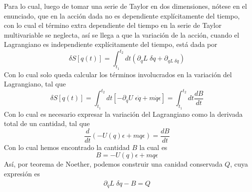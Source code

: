 \documentclass[../main_ej.tex]{subfiles}
\begin{document}
Para lo cual, luego de tomar una serie de Taylor en dos dimensiones, nótese en el enunciado, que en la acción dada no es dependiente explícitamente del tiempo, con lo cual el término extra dependiente del tiempo en la serie de Taylor multivariable se neglecta, así se llega a que la variación de la acción, cuando el Lagrangiano es independiente explícitamente del tiempo, está dada por
\begin{equation}
  \delta S[q(t)] = \int_{t_1}^{t_2} dt \left( \partial_q L \; \delta q + \partial_{\dot{q}L \;\delta \dot{q}}  \right)
\end{equation}
Con lo cual solo queda calcular los términos involucrados en la variación del Lagrangiano, tal que
\begin{equation}
  \delta S[q(t)] = \int_{t_1}^{t_2} dt \left[ -\partial_qU\; \epsilon\dot{q} + m\dot{q}\epsilon \right] = \int_{t_1}^{t_2} dt \frac{dB}{dt}
\end{equation}
Con lo cual es necesario expresar la variación del Lagrangiano como la derivada total de un cantidad, tal que 
\begin{equation}
  \frac{d}{dt}(-U(q)\epsilon + m q \epsilon) = \frac{dB}{dt}
\end{equation}
Con lo cual hemos encontrado la cantidad $B$ la cual es
\begin{equation}
 B = -U(q)\epsilon + mq\epsilon
\end{equation}
Así, por teorema de Noether, podemos construir una canidad conservada $Q$, cuya expresión es
\begin{align*}
  \partial_{\dot{q}}L \; \delta q - B = Q 
\end{align*}
\end{document}
